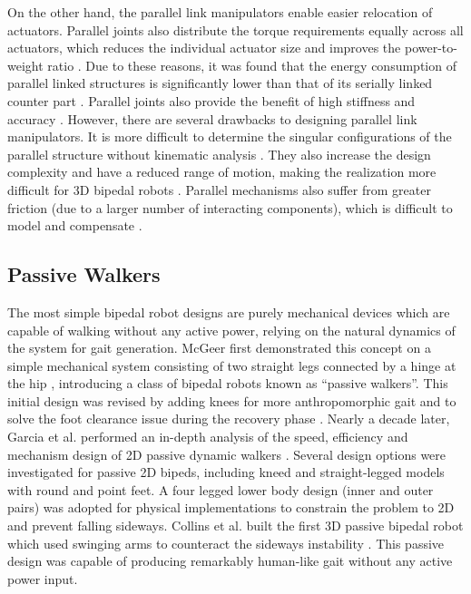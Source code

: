 On the other hand, the parallel link manipulators \cite{Merlet2006} enable easier relocation of actuators. Parallel joints also distribute the torque requirements equally across all actuators, which reduces the individual actuator size and improves the power-to-weight ratio \cite{Konno2002}. Due to these reasons, it was found that the energy consumption of parallel linked structures is significantly lower than that of its serially linked counter part \cite{Morisawa2000}. Parallel joints also provide the benefit of high stiffness and accuracy \cite{Sellaouti2005}. However, there are several drawbacks to designing parallel link manipulators. It is more difficult to determine the singular configurations of the parallel structure without kinematic analysis \cite{Sellaouti2005}. They also increase the design complexity and have a reduced range of motion, making the realization more difficult for 3D bipedal robots \cite{Lohmeier2006}. Parallel mechanisms also suffer from greater friction (due to a larger number of interacting components), which is difficult to model and compensate \cite{Yiu2001,Shang2008}.



\subsection{Passive Walkers} %
\label{sub:related_passive_designs}
The most simple bipedal robot designs are purely mechanical devices which are capable of walking without any active power, relying on the natural dynamics of the system for gait generation. McGeer first demonstrated this concept on a simple mechanical system consisting of two straight legs connected by a hinge at the hip \cite{McGeer:1990uk}, introducing a class of bipedal robots known as ``passive walkers''. This initial design was revised by adding knees for more anthropomorphic gait and to solve the foot clearance issue during the recovery phase \cite{McGeer:1990hh}. Nearly a decade later, Garcia et al. performed an in-depth analysis of the speed, efficiency and mechanism design of 2D passive dynamic walkers \cite{Garcia:2000kv}. Several design options were investigated for passive 2D bipeds, including kneed and straight-legged models with round and point feet. A four legged lower body design (inner and outer pairs) was adopted for physical implementations to constrain the problem to 2D and prevent falling sideways. Collins et al. built the first 3D passive bipedal robot which used swinging arms to counteract the sideways instability \cite{Collins:2001jq}. This passive design was capable of producing remarkably human-like gait without any active power input. 


